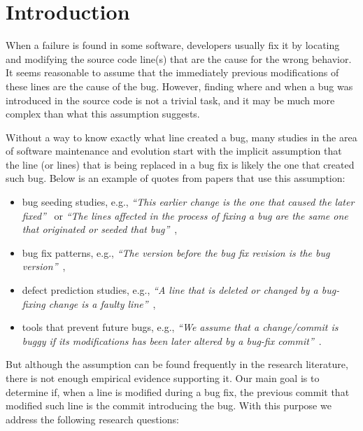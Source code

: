 \documentclass[conference]{IEEEtran}
\begin{document}
\IEEEpeerreviewmaketitle



\section{Introduction}

When a failure is found in some software, developers usually fix it by locating and modifying the source code line(s) that are the cause for the wrong behavior. It  seems reasonable to assume that the immediately previous modifications of these lines are the cause of the bug. However, finding where and when a bug was introduced in the source code is not a trivial task, and it may be much more complex than what this assumption suggests.

Without a way to know exactly what line created a bug, many studies in the area of software maintenance and evolution start with the implicit assumption that the line (or lines) that is being replaced in a bug fix is likely the one that created such bug. Below is an example of quotes from papers that use this assumption:

\begin{itemize}
\item bug seeding studies, e.g., \textit{``This earlier change is the one that caused the later
    fixed''}~\cite{williams2008szz} or \textit{``The lines affected in the process of fixing a bug are the same one that
    originated or seeded that bug''}~\cite{izquierdo2011developers},
\item bug fix patterns, e.g., \textit{``The version before the bug fix revision is the bug
    version''}~\cite{pan2009toward},
\item defect prediction studies, e.g., \textit{``A line that is deleted or changed by a bug-fixing change is a faulty
    line''}~\cite{altman1968financial},
\item tools that prevent future bugs, e.g., \textit{``We assume that a change/commit is buggy if its modifications has
    been later altered by a bug-fix commit''}~\cite{fejzer2015supporting}.
\end{itemize}

But although the assumption can be found frequently in the research literature, there is not enough empirical evidence supporting it. Our main goal is to determine if, when a line is modified during a bug fix, the previous commit that modified such line is the commit introducing the bug. With this purpose we address the following research questions: 
\end{document}
